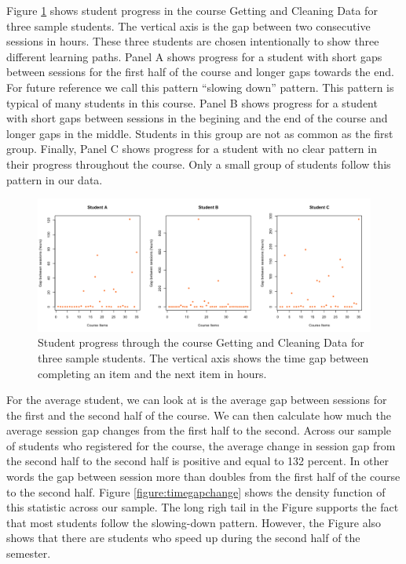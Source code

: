 Figure \ref{figure:sampleprogress} shows student progress in the course
Getting and Cleaning Data for three sample students. The vertical axis
is the gap between two consecutive sessions in hours. These three
students are chosen intentionally to show three different learning
paths. Panel A shows progress for a student with short gaps between
sessions for the first half of the course and longer gaps towards the
end. For future reference we call this pattern ``slowing down'' pattern.
This pattern is typical of many students in this course. Panel B shows
progress for a student with short gaps between sessions in the begining
and the end of the course and longer gaps in the middle. Students in
this group are not as common as the first group. Finally, Panel C shows
progress for a student with no clear pattern in their progress
throughout the course. Only a small group of students follow this
pattern in our data.

\begin{figure}[htbp] 
    \centering
    \includegraphics[scale=0.4]{sampleprogress}
    \caption{Student progress through the course Getting and Cleaning Data for three sample students. The vertical axis shows the time gap between completing an item and the next item in hours.}
    \label{figure:sampleprogress}
\end{figure}

For the average student, we can look at is the average gap between
sessions for the first and the second half of the course. We can then
calculate how much the average session gap changes from the first half
to the second. Across our sample of students who registered for the
course, the average change in session gap from the second half to the
second half is positive and equal to 132 percent. In other words the gap
between session more than doubles from the first half of the course to
the second half. Figure \ref{figure:timegapchange} shows the density
function of this statistic across our sample. The long righ tail in the
Figure supports the fact that most students follow the slowing-down
pattern. However, the Figure also shows that there are students who
speed up during the second half of the semester.

